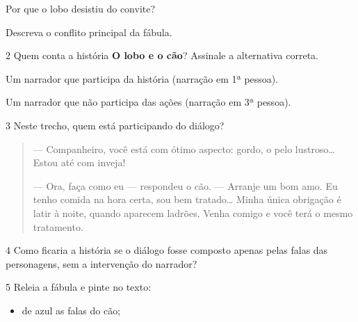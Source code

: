 \begin{escolha}
\begin{escolha}
{\begin{escolha}
\begin{escolha}
\item Por que o lobo desistiu do convite?


\item Descreva o conflito principal da fábula.

\end{escolha}

\num{2} Quem conta a história \textbf{O lobo e o cão}? Assinale a alternativa correta.

\begin{boxlist}
\boxitem[] Um narrador que participa da história (narração em 1ª pessoa).

\boxitem[\rosa{X}] Um narrador que não participa das ações (narração em 3ª pessoa).
\end{boxlist}

\num{3} Neste trecho, quem está participando do diálogo?

\begin{quote}
--- Companheiro, você está com ótimo aspecto: gordo, o pelo
lustroso\ldots{} Estou até com inveja!

--- Ora, faça como eu --- respondeu o cão. --- Arranje um bom amo. Eu
tenho comida na hora certa, sou bem tratado\ldots{} Minha única
obrigação é latir à noite, quando aparecem ladrões. Venha comigo e você
terá o mesmo tratamento.
\end{quote}


\num{4} Como ficaria a história se o diálogo fosse composto apenas pelas falas
das personagens, sem a intervenção do narrador?



\num{5} Releia a fábula e pinte no texto:

\begin{itemize}
\item de azul as falas do cão;


\end{itemize}
\end{escolha}}
\end{escolha}
\end{escolha}
